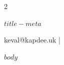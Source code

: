 \documentclass[a4paper]{article}
\begin{document}
    \begin{multicols}{2}
        \begin{huge}
            \centerline{$title-meta$}
        \end{huge}
        \begin{small}
            keval@kapdee.uk | 
        \end{small}
    \end{multicols}
    $body$
\end{document}
